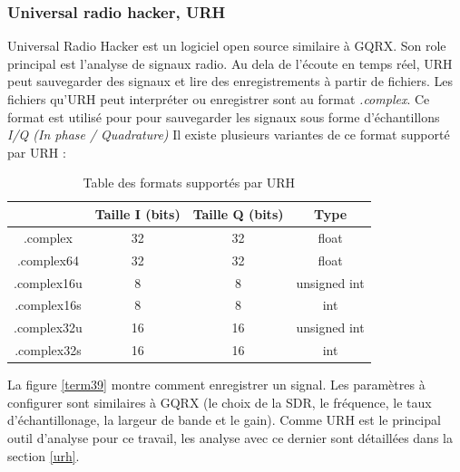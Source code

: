 \subsubsection{Universal radio hacker, URH}

Universal Radio Hacker est un logiciel open source similaire à GQRX. Son role principal est l'analyse de signaux radio. Au dela de l'écoute en temps réel, URH peut sauvegarder des signaux et lire des enregistrements à partir de fichiers. Les fichiers qu'URH peut interpréter ou enregistrer sont au format \textit{.complex}. Ce format est utilisé pour pour sauvegarder les signaux sous forme d'échantillons \textit{I/Q (In phase / Quadrature)} Il existe plusieurs variantes de ce format supporté par URH :

\vspace{0.1cm}

\begin{table}[h]
\centering
\begin{adjustbox}{width=1\textwidth}
\begin{tabular}{|c|c|c|c|}
\hline
\multicolumn{1}{|c|}{} & \multicolumn{1}{c|}{Taille I (bits)} &\multicolumn{1}{c|}{Taille Q (bits)} & \multicolumn{1}{c|}{Type}\\
\hline
.complex & 32 & 32 & float \\
\hline
.complex64 & 32 & 32 & float\\
\hline
.complex16u & 8 & 8 & unsigned int\\
\hline
.complex16s &  8 & 8 & int\\
\hline
.complex32u & 16 & 16 & unsigned int \\
\hline
.complex32s & 16 & 16 & int  \\
\hline
\end{tabular}
\end{adjustbox}
\caption{Table des formats supportés par URH}
\label{format}
\end{table}


La figure \ref{term39} montre comment enregistrer un signal. Les paramètres à configurer sont similaires à GQRX (le choix de la SDR, le fréquence, le taux d'échantillonage, la largeur de bande et le gain). Comme URH est le principal outil d'analyse pour ce travail, les analyse avec ce dernier sont détaillées dans la section \ref{urh}.

